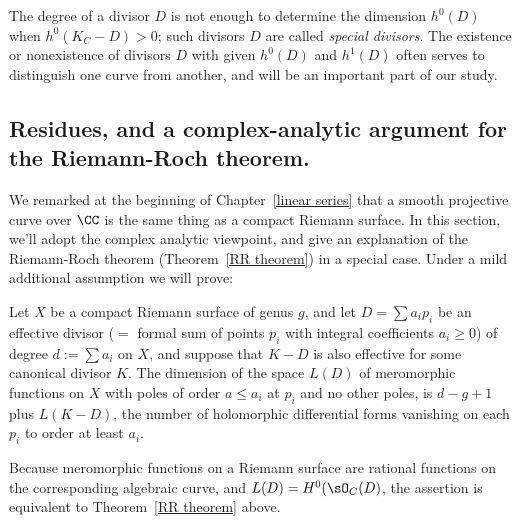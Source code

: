 The degree of a divisor $D$ is not enough to determine the dimension $h^0(D)$ when $h^0(K_C - D)>0$; such 
divisors $D$ are called \emph{special divisors}. The existence or nonexistence of divisors $D$ with given $h^{0}(D)$ and $h^{1}(D)$ often serves to distinguish one curve from another, and will be an important part of our study.

\subsection{Residues, and a complex-analytic argument for the Riemann-Roch theorem.}\label{RR by residues}

We remarked at the beginning of Chapter~\ref{linear series} that a smooth projective curve over $\CC$ is the same thing as a compact Riemann surface. In this section, we'll adopt the complex analytic viewpoint, and give an explanation of the Riemann-Roch theorem  (Theorem~\ref{RR theorem}) in a special case. Under a mild additional assumption we will prove:

\begin{theorem}
Let $X$ be a compact Riemann surface of genus $g$, and let $D = \sum a_i p_i$ be an effective divisor ($=$ formal sum of points $p_i$ with integral coefficients $a_i\geq 0$) of degree $d:= \sum a_i$ on $X$, and suppose that $K-D$ is also effective for some canonical divisor $K$.
The dimension of the space $L(D)$ of meromorphic functions on $X$ with poles of order $a\leq a_i$ at $p_i$ and no other poles, is
$d-g+1$ plus $L(K-D)$, the number of holomorphic differential forms vanishing on each $p_i$ to order at least $a_i$. 
\end{theorem}

Because  meromorphic functions on a Riemann surface are rational functions on the corresponding
algebraic curve, and $L(D) = H^0(\sO_C(D)$, the assertion is equivalent to Theorem~\ref{RR theorem} above.

